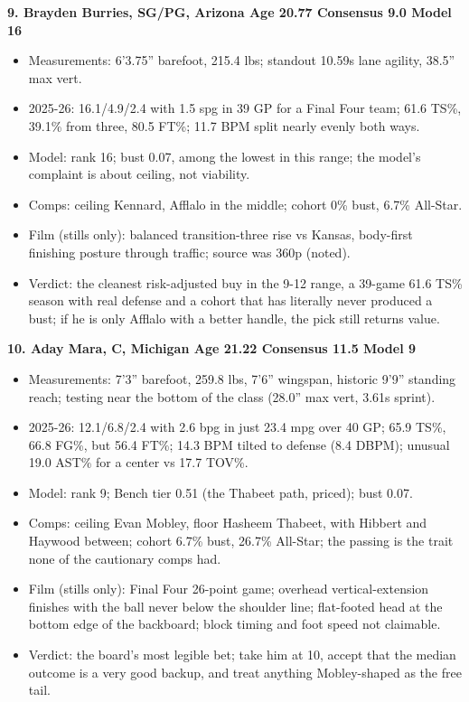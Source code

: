 \documentclass[
  10pt,
]{article}
\newcounter{none} %
\providecommand{\tightlist}{%
  \setlength{\itemsep}{0pt}\setlength{\parskip}{0pt}}
\begin{document}
\textbf{9. Brayden Burries, SG/PG, Arizona \textbar{} Age 20.77 \textbar{}
Consensus 9.0 \textbar{} Model 16}

\begin{itemize}
\tightlist
\item
  Measurements: 6'3.75'' barefoot, 215.4 lbs; standout 10.59s lane agility,
  38.5'' max vert.
\item
  2025-26: 16.1/4.9/2.4 with 1.5 spg in 39 GP for a Final Four team; 61.6 TS\%,
  39.1\% from three, 80.5 FT\%; 11.7 BPM split nearly evenly both ways.
\item
  Model: rank 16; bust 0.07, among the lowest in this range; the model's
  complaint is about ceiling, not viability.
\item
  Comps: ceiling Kennard, Afflalo in the middle; cohort 0\% bust, 6.7\%
  All-Star.
\item
  Film (stills only): balanced transition-three rise vs Kansas, body-first
  finishing posture through traffic; source was 360p (noted).
\item
  Verdict: the cleanest risk-adjusted buy in the 9-12 range, a 39-game 61.6 TS\%
  season with real defense and a cohort that has literally never produced a
  bust; if he is only Afflalo with a better handle, the pick still returns
  value.
\end{itemize}

\textbf{10. Aday Mara, C, Michigan \textbar{} Age 21.22 \textbar{} Consensus
11.5 \textbar{} Model 9}

\begin{itemize}
\tightlist
\item
  Measurements: 7'3'' barefoot, 259.8 lbs, 7'6'' wingspan, historic 9'9''
  standing reach; testing near the bottom of the class (28.0'' max vert, 3.61s
  sprint).
\item
  2025-26: 12.1/6.8/2.4 with 2.6 bpg in just 23.4 mpg over 40 GP; 65.9 TS\%,
  66.8 FG\%, but 56.4 FT\%; 14.3 BPM tilted to defense (8.4 DBPM); unusual 19.0
  AST\% for a center vs 17.7 TOV\%.
\item
  Model: rank 9; Bench tier 0.51 (the Thabeet path, priced); bust 0.07.
\item
  Comps: ceiling Evan Mobley, floor Hasheem Thabeet, with Hibbert and Haywood
  between; cohort 6.7\% bust, 26.7\% All-Star; the passing is the trait none of
  the cautionary comps had.
\item
  Film (stills only): Final Four 26-point game; overhead vertical-extension
  finishes with the ball never below the shoulder line; flat-footed head at the
  bottom edge of the backboard; block timing and foot speed not claimable.
\item
  Verdict: the board's most legible bet; take him at 10, accept that the median
  outcome is a very good backup, and treat anything Mobley-shaped as the free
  tail.
\end{itemize}
\end{document}
